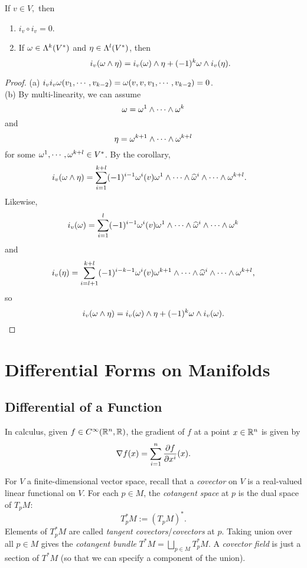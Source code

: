 \begin{lemma}\label{14.13}
    If $v \in V,$ then 
    \begin{enumerate}
    \item[(a)] $i_v \circ i_v = 0$.
    \item[(b)] If $\omega \in \Lambda^k(V^*)$ and $\eta \in \Lambda^l(V^*)$, then 
    $$i_v(\omega \wedge \eta) = i_v(\omega) \wedge \eta + (-1)^k \omega \wedge i_v(\eta). $$
    \end{enumerate}
\end{lemma}
\begin{proof}
    (a) $i_v i_v \omega(v_1,\cdots,v_{k-2}) = \omega(v,v,v_1,\cdots,v_{k-2})=0$. \\
    (b) By multi-linearity, we can assume 
    $$\omega = \omega^1 \wedge \cdots \wedge \omega^k$$ and 
    $$\eta = \omega^{k+1} \wedge \cdots \wedge \omega^{k+l}$$
    for some $\omega^1,\cdots,\omega^{k+l} \in V^*$. By the corollary, 
    \begin{align*}
    i_v(\omega \wedge \eta) &= \sum_{i=1}^{k+l}(-1)^{i-1}\omega^i(v) \omega^1 \wedge \cdots \wedge \widehat{\omega}^i \wedge \cdots \wedge \omega^{k+l}.
    \end{align*}
    Likewise,
    $$
    i_v(\omega) = \sum_{i=1}^{l}(-1)^{i-1}\omega^i(v) \omega^1 \wedge \cdots \wedge \widehat{\omega}^i \wedge \cdots \wedge \omega^{k}$$ and 
    $$
    i_v(\eta) = \sum_{i=l+1}^{k+l}(-1)^{i-k-1}
    \omega^i(v) \omega^{k+1} \wedge \cdots \wedge \widehat{\omega}^i \wedge \cdots \wedge \omega^{k+l},$$
    so 
    $$i_v(\omega \wedge \eta) = i_v(\omega) \wedge \eta + (-1)^k \omega \wedge i_v(\omega). $$
\end{proof}

\section{Differential Forms on Manifolds}
\subsection{Differential of a Function}
In calculus, given $f \in C^\infty(\mathbb{R}^n, \mathbb{R})$, the gradient of $f$ at a point $x \in \mathbb{R}^n$ is given by 
$$\nabla f (x) = \sum_{i=1}^{n} {\pdv{f}{x^i}}(x).$$

For $V$ a finite-dimensional vector space, recall that a \textit{covector} on $V$ is a real-valued linear functional on $V$. For each $p \in M$, the \textit{cotangent space} at $p$ is the dual space of $T_pM$:
$$T_p^*M := (T_p M)^*.$$
Elements of $T_p^*M$ are called \textit{tangent covectors}/\textit{covectors} at $p$. Taking union over all $p \in M$ gives the \textit{cotangent bundle} $T^*M = \bigsqcup_{p \in M}T_p^*M$. A \textit{covector field} is just a section of $T^*M$ (so that we can specify a component of the union). 

